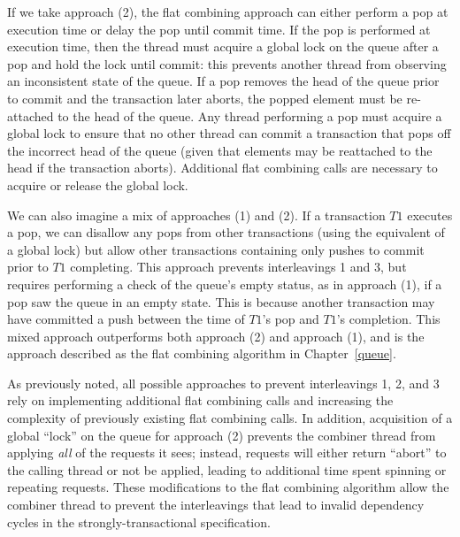 If we take approach (2), the flat combining approach can either perform a pop at execution time or delay the pop until commit time. If the pop is performed at execution time, then the thread must acquire a global lock on the queue after a pop and hold the lock until commit: this prevents another thread from observing an inconsistent state of the queue. If a pop removes the head of the queue prior to commit and the transaction later aborts, the popped element must be re-attached to the head of the queue. Any thread performing a pop must acquire a global lock to ensure that no other thread can commit a transaction that pops off the incorrect head of the queue (given that elements may be reattached to the head if the transaction aborts). Additional flat combining calls are necessary to acquire or release the global lock. 

We can also imagine a mix of approaches (1) and (2). If a transaction $T1$ executes a pop, we can disallow any pops from other transactions (using the equivalent of a global lock) but allow other transactions containing only pushes to commit prior to $T1$ completing. This approach prevents interleavings 1 and 3, but requires performing a check of the queue's empty status, as in approach (1), if a pop saw the queue in an empty state. This is because another transaction may have committed a push between the time of $T1$'s pop and $T1$'s completion. This mixed approach outperforms both approach (2) and approach (1), and is the approach described as the flat combining algorithm in Chapter~\ref{queue}. 

As previously noted, all possible approaches to prevent interleavings 1, 2, and 3 rely on implementing additional flat combining calls and increasing the complexity of previously existing flat combining calls. In addition, acquisition of a global ``lock'' on the queue for approach (2) prevents the combiner thread from applying \emph{all} of the requests it sees; instead, requests will either return ``abort'' to the calling thread or not be applied, leading to additional time spent spinning or repeating requests. These modifications to the flat combining algorithm allow the combiner thread to prevent the interleavings that lead to invalid dependency cycles in the strongly-transactional specification.

